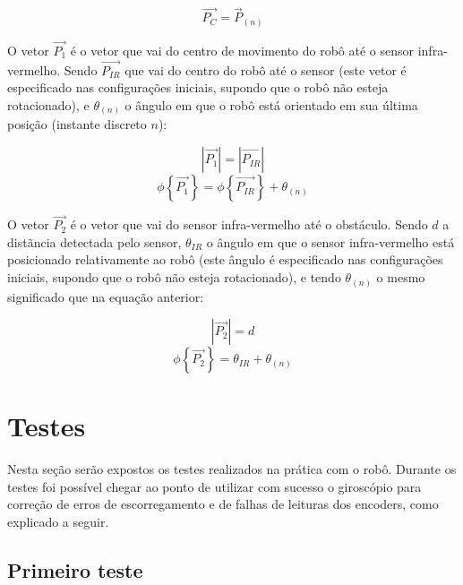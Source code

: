 \begin{equation}
  \overrightarrow{P_C} = \overrightarrow{P}_{(n)}
  \label{eq:IR-P_C}
\end{equation}

O vetor $\overrightarrow{P_1}$ é o vetor que vai do centro de movimento do robô até o sensor infra-vermelho. Sendo $\overrightarrow{P_{IR}}$ que vai do centro do robô até o sensor (este vetor é especificado nas configurações iniciais, supondo que o robô não esteja rotacionado), e $\theta_{(n)}$ o ângulo em que o robô está orientado em sua última posição (instante discreto $n$):


\begin{equation}
  |\overrightarrow{P_1}| = |\overrightarrow{P_{IR}}|
  \label{eq:IR-P_1_modulo}
\end{equation}
\begin{equation}
  \phi \left\{ \overrightarrow{P_1} \right\} = \phi \left\{ \overrightarrow{P_{IR}} \right\} + \theta_{(n)}
  \label{eq:IR-P_1_fase}
\end{equation}


O vetor $\overrightarrow{P_2}$ é o vetor que vai do sensor infra-vermelho até o obstáculo. Sendo $d$ a distãncia detectada pelo sensor, $\theta_{IR}$ o ângulo em que o sensor infra-vermelho está posicionado relativamente ao robô (este ângulo é especificado nas configurações iniciais, supondo que o robô não esteja rotacionado), e tendo $\theta_{(n)}$ o mesmo significado que na equação anterior:

\begin{equation}
  |\overrightarrow{P_2}| = d
  \label{eq:IR-P_2_modulo}
\end{equation}
\begin{equation}
  \phi \left\{ \overrightarrow{P_2} \right\} = \theta_{IR} + \theta_{(n)}
  \label{eq:IR-P_2_fase}
\end{equation}


\chapter{Testes}
 
Nesta seção serão expostos os testes realizados na prática com o robô. Durante os testes foi possível chegar ao ponto de utilizar com sucesso o giroscópio para correção de erros de escorregamento e de falhas de leituras dos encoders, como explicado a seguir. %

 
\section{Primeiro teste}


